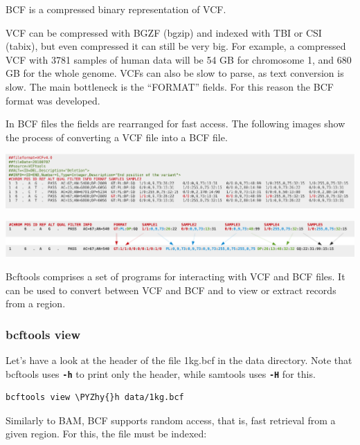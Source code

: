 \documentclass[11pt]{article}
\makeatletter
\def\PYZhy{\char`\-}
\newcommand{\boxspacing}{\kern\kvtcb@left@rule\kern\kvtcb@boxsep}
\newcommand{\prompt}[4]{
        {\ttfamily\llap{{\color{blue}\LARGE\faKeyboardO\hspace{3pt}#4}}\vspace{-\baselineskip}}
    }
\makeatother
\begin{document}
BCF is a compressed binary representation of VCF.

VCF can be compressed with BGZF (bgzip) and indexed with TBI or CSI
(tabix), but even compressed it can still be very big. For example, a
compressed VCF with 3781 samples of human data will be 54 GB for
chromosome 1, and 680 GB for the whole genome. VCFs can also be slow to
parse, as text conversion is slow. The main bottleneck is the ``FORMAT''
fields. For this reason the BCF format was developed.

In BCF files the fields are rearranged for fast access. The following
images show the process of converting a VCF file into a BCF file.

    \includegraphics{img/VCF2.png}

    \includegraphics{img/VCF3.png}

    Bcftools comprises a set of programs for interacting with VCF and BCF
files. It can be used to convert between VCF and BCF and to view or
extract records from a region.

\hypertarget{bcftools-view}{%
\subsubsection{bcftools view}\label{bcftools-view}}

Let's have a look at the header of the file 1kg.bcf in the data
directory. Note that bcftools uses \textbf{\texttt{-h}} to print only
the header, while samtools uses \textbf{\texttt{-H}} for this.

    \begin{tcolorbox}[breakable, size=fbox, boxrule=1pt, pad at break*=1mm,colback=cellbackground, colframe=cellborder]
\prompt{In}{incolor}{ }{\boxspacing}
\begin{Verbatim}[commandchars=\\\{\}]
bcftools view \PYZhy{}h data/1kg.bcf
\end{Verbatim}
\end{tcolorbox}

    Similarly to BAM, BCF supports random access, that is, fast retrieval
from a given region. For this, the file must be indexed:
\end{document}
